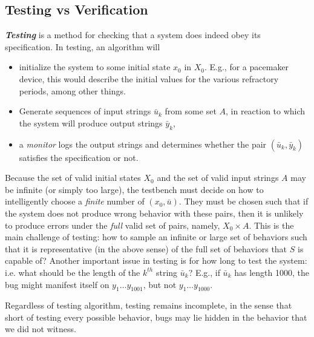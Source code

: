 \subsection{Testing vs Verification}

\newcommand{\ub}{\bar{u}}
\newcommand{\yb}{\bar{y}}

\emph{\textbf{Testing}} is a method for checking that a system does indeed obey its specification. 
In testing, an algorithm will 
\begin{itemize}
	\item initialize the system to some initial state $x_0$ in $X_0$.
	E.g., for a pacemaker device, this would describe the initial values for the various refractory periods, among other things.
	\item Generate sequences of input strings $\bar{u}_k$ from some set $A$, in reaction to which the system will produce output strings $\bar{y}_k$,
	\item a \emph{monitor} logs the output strings and determines whether the pair $(\bar{u}_k,\bar{y}_k)$ satisfies the specification or not.	
\end{itemize}

Because the set of valid initial states $X_0$ and the set of valid input strings $A$ may be infinite (or simply too large), the testbench must decide on how to intelligently choose a \emph{finite} number of $(x_0,\ub)$.
They must be chosen such that if the system does not produce wrong behavior with these pairs, then it is unlikely to produce errors under the \emph{full} valid set of pairs, namely, $X_0 \times A$.
This is the main challenge of testing: how to sample an infinite or large set of behaviors such that it is representative (in the above sense) of the full set of behaviors that $S$ is capable of?
Another important issue in testing is for how long to test the system: i.e. what should be the length of the $k^{th}$ string $\ub_k$? 
E.g., if $\ub_k$ has length 1000, the bug might manifest itself on $y_1\ldots y_{1001}$, but not $y_1\ldots y_{1000}$.

Regardless of testing algorithm, testing remains incomplete, in the sense that short of testing every possible behavior, bugs may lie hidden in the behavior that we did not witness.


